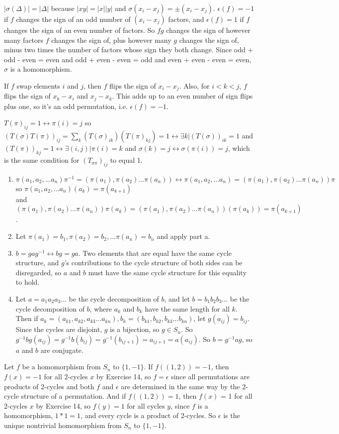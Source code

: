 \documentclass[11pt, oneside]{article}   	%
\newcommand{\inv}{^{-1}}
\newcommand{\be}{\begin{enumerate}}
\newcommand{\ee}{\end{enumerate}}
\newcommand{\lra}{\leftrightarrow}
\newcommand{\cycle}{(a_1, a_2, \ldots a_n)}
\newcommand{\picycle}{ (\pi(a_1), \pi(a_2) \ldots \pi(a_n))}
\begin{document}
\item $|\sigma(\Delta)| = |\Delta|$ because $|xy| = |x||y|$ and $\sigma(x_i - x_j) = \pm (x_i - x_j)$. $\epsilon(f) = -1$ if $f$ changes the sign of an odd number of $(x_i - x_j)$ factors, and $\epsilon(f) = 1$ if $f$ changes the sign of an even number of factors. So $fg$ changes the sign of however many factors $f$ changes the sign of, plus however many $g$ changes the sign of, minus two times the number of factors whose sign they both change. Since odd + odd - even = even and odd + even - even = odd and even + even - even = even, $\sigma$ is a homomorphism.
\item If $f$ swap elements $i$ and $j$, then $f$ flips the sign of $x_i - x_j$. Also, for $i < k < j$, $f$ flips the sign of $x_k - x_i$ and $x_j - x_k$. This adds up to an even number of sign flips plus one, so it's an odd permutation, i.e. $\epsilon(f) = -1$.
\item $T(\pi)_{ij} = 1 \lra \pi(i) = j$ so $(T(\sigma)T(\pi))_{ij} = \sum_k(T(\sigma)_{ik})(T(\pi)_{kj}) = 1 \lra \exists k | (T(\sigma))_{ik} = 1$ and $(T(\pi))_{kj} = 1 \lra \exists (i, j) | \pi(i) = k$ and $\sigma(k) = j
\lra \sigma(\pi(i)) = j$, which is the same condition for $(T_{\sigma\pi})_{ij}$ to equal 1.
\item \be
\item $\pi\cycle\pi\inv =\picycle \lra \pi\cycle = \picycle\pi$ so $\pi\cycle(a_k) = \pi(a_{k+1})$ \\ and $\picycle\pi(a_k) = \picycle(\pi(a_k)) = \pi(a_{k+1})$. 
\item Let $\pi(a_1) = b_1, \pi(a_2) = b_2, \ldots \pi(a_n) = b_n$ and apply part a.
\item $b = gag\inv \lra bg = ga$. Two elements that are equal have the same cycle structure, and $g$'s contributions to the cycle structure of both sides can be disregarded, so $a$ and $b$ must have the same cycle structure for this equality to hold.
\item Let $a = a_1a_2a_3\ldots$ be the cycle decomposition of $b$, and let $b = b_1b_2b_3\ldots$ be the cycle decomposition of $b$, where $a_k$ and $b_k$ have the same length for all $k$. Then if $a_k = (a_{k1}, a_{k2}, a_{k3}\ldots a_{kn}), b_k = (b_{k1}, b_{k2}, b_{k3}\ldots b_{kn})$, let $g(a_{ij}) = b_{ij}$. Since the cycles are disjoint, $g$ is a bijection, so $g \in S_n$. So $g\inv b g(a_{ij}) = g\inv b(b_{ij}) = g\inv(b_{ij+1}) = a_{ij+1} = a(a_{ij}).$ So $b = g\inv a g$, so $a$ and $b$ are conjugate.
\ee
\item Let $f$ be a homomorphism from $S_n$ to $\{1, -1\}$. If $f((1, 2)) = -1$, then $f(x) = -1$ for all 2-cycles $x$ by Exercise 14, so $f = \epsilon$ since all permutations are products of 2-cycles and both $f$ and $\epsilon$ are determined in the same way by the 2-cycle structure of a permutation. And if $f((1, 2)) = 1$, then $f(x)$ = 1 for all 2-cycles $x$ by Exercise 14, so $f(y) = 1$ for all cycles $y$, since $f$ is a homomorphism, $1*1 = 1$, and every cycle is a product of 2-cycles. So $\epsilon$ is the unique nontrivial homomorphism from $S_n$ to $\{1, -1\}$.
\end{document}
